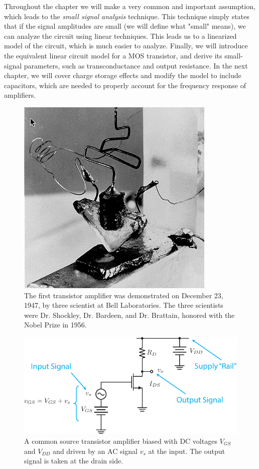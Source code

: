 Throughout the chapter we will make a very common and important assumption, which leads to the \emph{small signal analysis} technique.  This technique simply states that if the signal amplitudes are small (we will define what "small" means), we can analyze the circuit using linear techniques. This leads us to a linearized model of the circuit, which is much easier to analyze.  Finally, we will introduce the equivalent linear circuit model for a MOS transistor, and derive its small-signal parameters, such as transconductance and output resistance.  In the next chapter, we will cover charge storage effects and modify the model to include capacitors, which are needed to properly account for the frequency response of amplifiers.
\begin{figure}[H]
\centering
\includegraphics[width=.25\columnwidth]{bjt_invent.png}
\caption{The first transistor amplifier was demonstrated on December 23, 1947, by three scientist at Bell Laboratories.  The three scientists were Dr. Shockley, Dr. Bardeen, and Dr. Brattain, honored with the Nobel Prize in 1956.}
\label{fig:ch09_intro_bjt_invent}
\end{figure}
\newpage
\begin{figure}[t]
\centering
\includegraphics[width=\columnwidth]{csamp_signals}
\caption{A common source transistor amplifier biased with DC voltages $V_{GS}$ and $V_{DD}$ and driven by an AC signal $v_s$ at the input.  The output signal is taken at the drain side.}
\label{fig:csamp_signals}
\end{figure}
